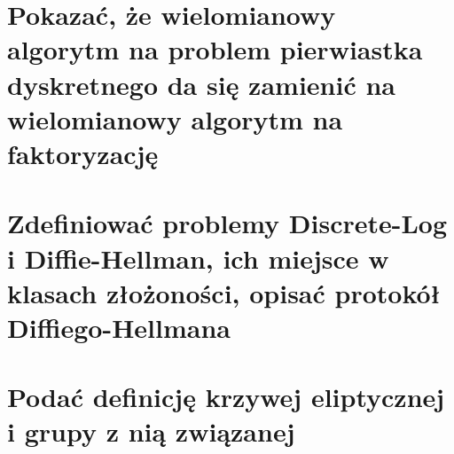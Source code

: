 \section{Pokazać, że wielomianowy algorytm na problem pierwiastka dyskretnego da się zamienić na wielomianowy algorytm na faktoryzację}
\label{A:question09}


\section{Zdefiniować problemy Discrete-Log i Diffie-Hellman, ich miejsce w klasach złożoności, opisać protokół Diffiego-Hellmana}


\section{Podać definicję krzywej eliptycznej i grupy z nią związanej}
